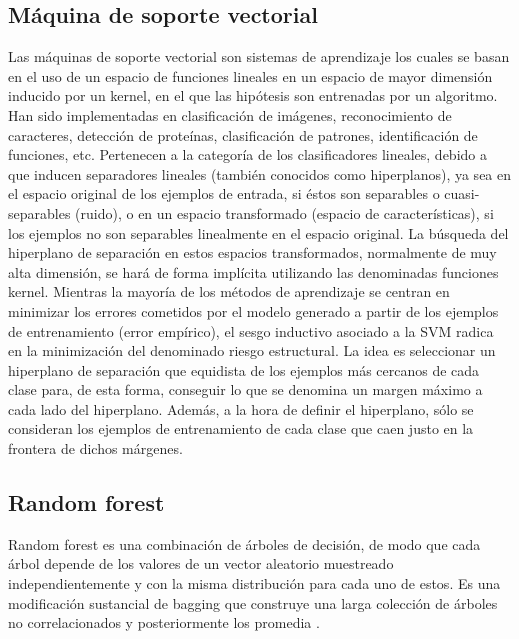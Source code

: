 \subsection{Máquina de soporte vectorial}

Las máquinas de soporte vectorial son sistemas de aprendizaje los
cuales se basan en el uso de un espacio de funciones lineales en un espacio de mayor dimensión inducido
por un kernel, en el que las hipótesis son entrenadas por un algoritmo\citep{CT8}.
Han sido implementadas en clasificación de imágenes, reconocimiento de caracteres, detección de
proteínas, clasificación de patrones, identificación de funciones, etc.
Pertenecen a la categoría de los clasificadores lineales, debido a que inducen separadores lineales
(también conocidos como hiperplanos), ya sea en el espacio original de los ejemplos de entrada, si éstos son separables o cuasi-separables (ruido), o en un espacio transformado (espacio de características),
si los ejemplos no son separables linealmente en el espacio original. La búsqueda del hiperplano
de separación en estos espacios transformados, normalmente de muy alta dimensión, se hará de forma
implícita utilizando las denominadas funciones kernel. Mientras la mayoría de los métodos de aprendizaje
se centran en minimizar los errores cometidos por el modelo generado a partir de los ejemplos
de entrenamiento (error empírico), el sesgo inductivo asociado a la SVM radica en la minimización
del denominado riesgo estructural.
La idea es seleccionar un hiperplano de separación que equidista de los ejemplos más cercanos de
cada clase para, de esta forma, conseguir lo que se denomina un margen máximo a cada lado del hiperplano.
Además, a la hora de definir el hiperplano, sólo se consideran los ejemplos de entrenamiento
de cada clase que caen justo en la frontera de dichos márgenes. 

\subsection{Random forest}

Random forest es una combinación de árboles de decisión, de modo que cada árbol depende de los valores de un vector 
aleatorio muestreado independientemente y con la misma distribución para cada uno de estos. Es una modificación sustancial de bagging que construye una 
larga colección de árboles no correlacionados y posteriormente los promedia \citep{CT9}.\\


